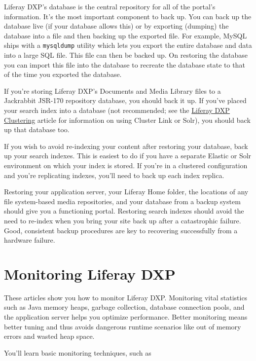 Liferay DXP's database is the central repository for all of the portal's
information. It's the most important component to back up. You can back
up the database live (if your database allows this) or by exporting
(dumping) the database into a file and then backing up the exported
file. For example, MySQL ships with a \texttt{mysqldump} utility which
lets you export the entire database and data into a large SQL file. This
file can then be backed up. On restoring the database you can import
this file into the database to recreate the database state to that of
the time you exported the database.

If you're storing Liferay DXP's Documents and Media Library files to a
Jackrabbit JSR-170 repository database, you should back it up. If you've
placed your search index into a database (not recommended; see the
\href{/docs/7-2/deploy/-/knowledge_base/d/liferay-clustering}{Liferay
DXP Clustering} article for information on using Cluster Link or Solr),
you should back up that database too.

If you wish to avoid re-indexing your content after restoring your
database, back up your search indexes. This is easiest to do if you have
a separate Elastic or Solr environment on which your index is stored. If
you're in a clustered configuration and you're replicating indexes,
you'll need to back up each index replica.

Restoring your application server, your Liferay Home folder, the
locations of any file system-based media repositories, and your database
from a backup system should give you a functioning portal. Restoring
search indexes should avoid the need to re-index when you bring your
site back up after a catastrophic failure. Good, consistent backup
procedures are key to recovering successfully from a hardware failure.

\chapter{Monitoring Liferay DXP}\label{monitoring-liferay-dxp}

These articles show you how to monitor Liferay DXP. Monitoring vital
statistics such as Java memory heaps, garbage collection, database
connection pools, and the application server helps you optimize
performance. Better monitoring means better tuning and thus avoids
dangerous runtime scenarios like out of memory errors and wasted heap
space.

You'll learn basic monitoring techniques, such as


